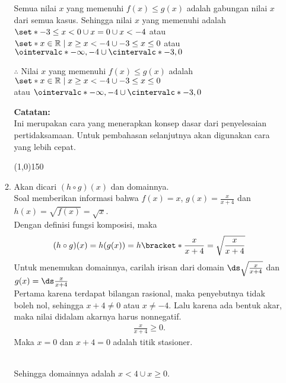\begin{enumerate}[leftmargin=*, label={\arabic*}.]
\begin{enumerate}[label={\alph*}.]
Semua nilai $x$ yang memenuhi $f(x) \leq g(x)$ adalah gabungan nilai $x$ 
dari semua kasus. Sehingga nilai $x$ yang memenuhi adalah 
$\set*{-3 \leq x < 0 \cup x = 0 \cup x < -4}$ atau 
$\set*{x \in \mathbb{R} \mid x \geq x < -4 \cup -3 \leq x \leq 0}$
atau $\ointervalc*{-\infty, -4} \cup \cintervalc*{-3,0}$
    
$\therefore$ Nilai $x$ yang memenuhi $f(x) \leq g(x)$ adalah
$\set*{x \in \mathbb{R} \mid x \geq x < -4 \cup -3 \leq x \leq 0}$\\
atau $\ointervalc*{-\infty, -4} \cup \cintervalc*{-3,0}$
    
\vspace{0.1cm}
\textbf{Catatan:}\\
Ini merupakan cara yang menerapkan konsep dasar dari penyelesaian
pertidaksamaan. Untuk pembahasan selanjutnya akan digunakan cara yang 
lebih cepat.
\begin{center}
    \line(1,0){150}
\end{center}
\item Akan dicari $(h \circ g)(x)$ dan domainnya.\\
Soal memberikan informasi bahwa $f(x) = x$, $g(x) = \frac{x}{x+4}$ 
dan $h(x) = \sqrt{f(x)} = \sqrt{x}$.\\
Dengan definisi fungsi komposisi, maka
\[
    (h \circ g)(x) = h(g(x)) = h\bracket*{\frac{x}{x+4}} 
    = \sqrt{\frac{x}{x+4}}
\]
Untuk menemukan domainnya, carilah irisan dari domain  
$\ds \sqrt{\frac{x}{x+4}}$ dan $g(x)=\ds\frac{x}{x+4}$\\
Pertama karena terdapat bilangan rasional, maka penyebutnya tidak boleh
nol, sehingga $x+4 \neq 0$ atau $x\neq-4$. Lalu karena ada bentuk akar, 
maka nilai didalam akarnya harus nonnegatif.
\begin{align*}
    \frac{x}{x+4} \geq 0.
\end{align*}
Maka $x=0$ dan $x+4=0$ adalah titik stasioner.

\vspace{0.2cm}
\\
Sehingga domainnya adalah $x < 4 \cup x \geq 0$.


\end{enumerate}
\end{enumerate}
